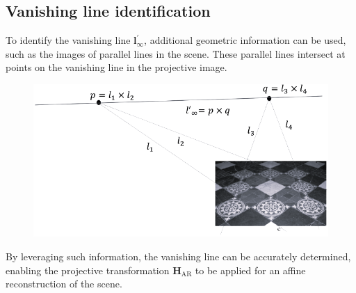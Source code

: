 \subsection{Vanishing line identification}
To identify the vanishing line $\mathbf{l}^\prime_{\infty}$, additional geometric information can be used, such as the images of parallel lines in the scene. 
These parallel lines intersect at points on the vanishing line in the projective image.
\begin{figure}[H]
    \centering
    \includegraphics[width=0.5\linewidth]{images/van.png}
\end{figure}
By leveraging such information, the vanishing line can be accurately determined, enabling the projective transformation $\mathbf{H}_{\text{AR}}$ to be applied for an affine reconstruction of the scene.
